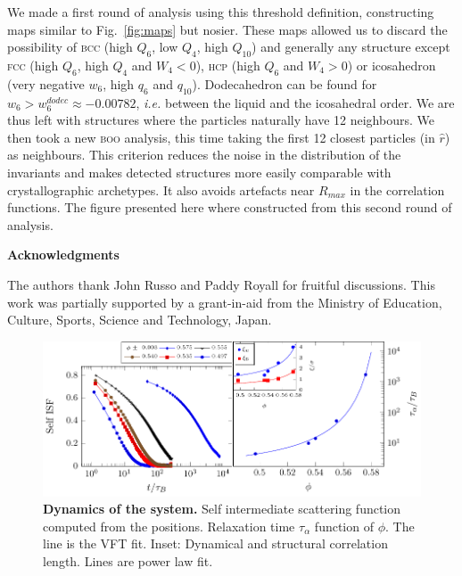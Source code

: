 We made a first round of analysis using this threshold definition, constructing maps similar to Fig.~\ref{fig:maps} but nosier. These maps allowed us to discard the possibility of \textsc{bcc} (high $Q_6$, low $Q_4$, high $Q_{10}$) and generally any structure except \textsc{fcc} (high $Q_6$, high $Q_4$ and $W_4<0$), \textsc{hcp} (high $Q_6$ and $W_4>0$) or icosahedron (very negative $w_6$, high $q_6$ and $q_{10}$). Dodecahedron can be found for $w_6>w_6^{dodec}\approx -0.00782$, \emph{i.e.} between the liquid and the icosahedral order. We are thus left with structures where the particles naturally have 12 neighbours. We then took a new \textsc{boo} analysis, this time taking the first 12 closest particles (in $\hat{r}$) as neighbours. This criterion reduces the noise in the distribution of the invariants and makes detected structures more easily comparable with crystallographic archetypes. It also avoids artefacts near $R_{max}$ in the correlation functions. The figure presented here where constructed from this second round of analysis.


%


\vspace{2cm}
\noindent
\textbf{Acknowledgments}

\noindent
The authors thank John Russo and Paddy Royall for fruitful discussions. 
This work was partially supported by a grant-in-aid from the 
Ministry of Education, Culture, Sports, Science and Technology, Japan. 

\clearpage

\begin{figure}
\begin{center}
\includegraphics{generate_figures-figure0.pdf}
\end{center}
\caption{\textbf{Dynamics of the system.} Self intermediate scattering function computed from the positions. Relaxation time $\tau_\alpha$ function of $\phi$. The line is the VFT fit. Inset: Dynamical and structural correlation length. Lines are power law fit.}
	\label{fig:vft}
\end{figure}

